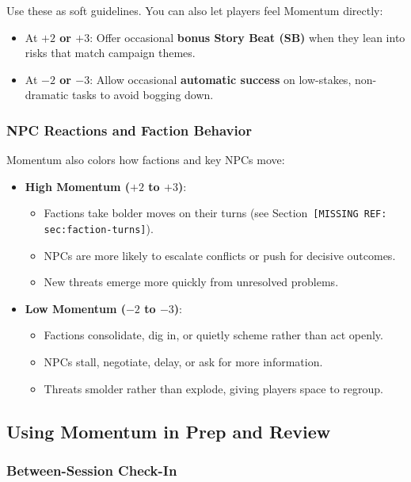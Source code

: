 \documentclass[11pt]{article}
\begin{document}
Use these as soft guidelines. You can also let players feel Momentum directly:

\begin{itemize}
  \item At \textbf{$+2$ or $+3$}: Offer occasional \textbf{bonus Story Beat (SB)} when they lean into risks that match campaign themes.
  \item At \textbf{$-2$ or $-3$}: Allow occasional \textbf{automatic success} on low-stakes, non-dramatic tasks to avoid bogging down.
\end{itemize}

\subsubsection{NPC Reactions and Faction Behavior}

Momentum also colors how factions and key NPCs move:

\begin{itemize}
  \item \textbf{High Momentum ($+2$ to $+3$)}:
  \begin{itemize}
    \item Factions take bolder moves on their turns (see Section~\texttt{[MISSING REF: sec:faction-turns]}).
    \item NPCs are more likely to escalate conflicts or push for decisive outcomes.
    \item New threats emerge more quickly from unresolved problems.
  \end{itemize}
  \item \textbf{Low Momentum ($-2$ to $-3$)}:
  \begin{itemize}
    \item Factions consolidate, dig in, or quietly scheme rather than act openly.
    \item NPCs stall, negotiate, delay, or ask for more information.
    \item Threats smolder rather than explode, giving players space to regroup.
  \end{itemize}
\end{itemize}

\subsection{Using Momentum in Prep and Review}

\subsubsection{Between-Session Check-In}
\end{document}
